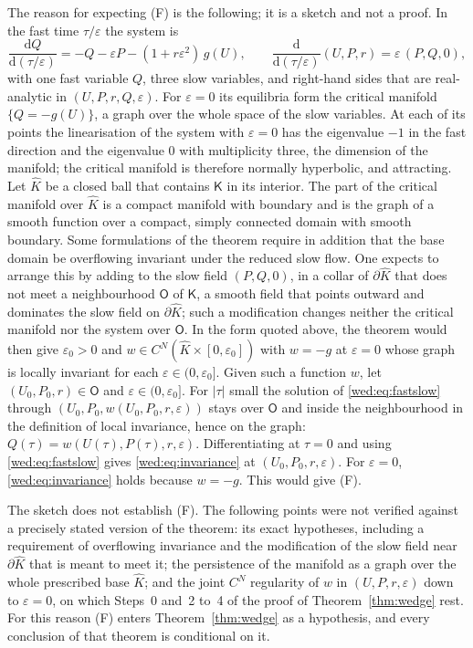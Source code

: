 The reason for expecting \textup{(F)} is the following; it is a sketch and not a proof. In the fast time $\tau/\varepsilon$ the system is
\[
\frac{\mathrm dQ}{\mathrm d(\tau/\varepsilon)}=-Q-\varepsilon P-(1+r\varepsilon^2)\,g(U),\qquad
\frac{\mathrm d}{\mathrm d(\tau/\varepsilon)}(U,P,r)=\varepsilon\,(P,Q,0),
\]
with one fast variable $Q$, three slow variables, and right-hand sides that are real-analytic in $(U,P,r,Q,\varepsilon)$. For $\varepsilon=0$ its equilibria form the critical manifold $\{Q=-g(U)\}$, a graph over the whole space of the slow variables. At each of its points the linearisation of the system with $\varepsilon=0$ has the eigenvalue $-1$ in the fast direction and the eigenvalue $0$ with multiplicity three, the dimension of the manifold; the critical manifold is therefore normally hyperbolic, and attracting. Let $\hat K$ be a closed ball that contains $\mathsf K$ in its interior. The part of the critical manifold over $\hat K$ is a compact manifold with boundary and is the graph of a smooth function over a compact, simply connected domain with smooth boundary. Some formulations of the theorem require in addition that the base domain be overflowing invariant under the reduced slow flow. One expects to arrange this by adding to the slow field $(P,Q,0)$, in a collar of $\partial\hat K$ that does not meet a neighbourhood $\mathsf O$ of $\mathsf K$, a smooth field that points outward and dominates the slow field on $\partial\hat K$; such a modification changes neither the critical manifold nor the system over $\mathsf O$. In the form quoted above, the theorem would then give $\varepsilon_0>0$ and $w\in C^N(\hat K\times[0,\varepsilon_0])$ with $w=-g$ at $\varepsilon=0$ whose graph is locally invariant for each $\varepsilon\in(0,\varepsilon_0]$. Given such a function $w$, let $(U_0,P_0,r)\in\mathsf O$ and $\varepsilon\in(0,\varepsilon_0]$. For $|\tau|$ small the solution of \eqref{wed:eq:fastslow} through $(U_0,P_0,w(U_0,P_0,r,\varepsilon))$ stays over $\mathsf O$ and inside the neighbourhood in the definition of local invariance, hence on the graph: $Q(\tau)=w(U(\tau),P(\tau),r,\varepsilon)$. Differentiating at $\tau=0$ and using \eqref{wed:eq:fastslow} gives \eqref{wed:eq:invariance} at $(U_0,P_0,r,\varepsilon)$. For $\varepsilon=0$, \eqref{wed:eq:invariance} holds because $w=-g$. This would give \textup{(F)}.

The sketch does not establish \textup{(F)}. The following points were not verified against a precisely stated version of the theorem: its exact hypotheses, including a requirement of overflowing invariance and the modification of the slow field near $\partial\hat K$ that is meant to meet it; the persistence of the manifold as a graph over the whole prescribed base $\hat K$; and the joint $C^N$ regularity of $w$ in $(U,P,r,\varepsilon)$ down to $\varepsilon=0$, on which Steps~0 and~2 to~4 of the proof of Theorem~\ref{thm:wedge} rest. For this reason \textup{(F)} enters Theorem~\ref{thm:wedge} as a hypothesis, and every conclusion of that theorem is conditional on it.


